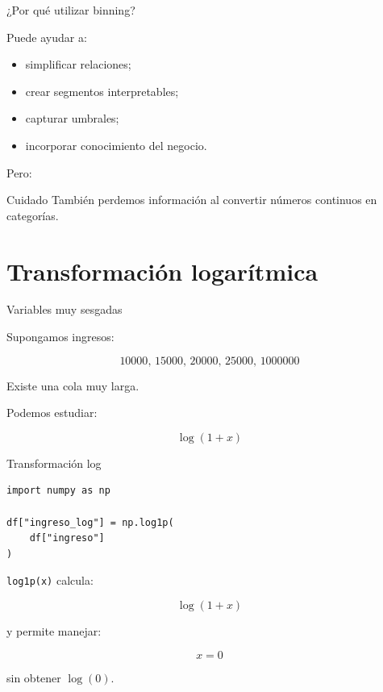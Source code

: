 \documentclass[aspectratio=169,11pt]{beamer}
\begin{document}

\begin{frame}{¿Por qué utilizar binning?}

Puede ayudar a:

\begin{itemize}

    \item simplificar relaciones;

    \item crear segmentos interpretables;

    \item capturar umbrales;

    \item incorporar conocimiento del negocio.

\end{itemize}

Pero:

\begin{alertblock}{Cuidado}
También perdemos información al convertir números continuos
en categorías.
\end{alertblock}

\end{frame}

\section{Transformación logarítmica}

\begin{frame}{Variables muy sesgadas}

Supongamos ingresos:

\[
10000,\,
15000,\,
20000,\,
25000,\,
1000000
\]

Existe una cola muy larga.

Podemos estudiar:

\[
\log(1+x)
\]

\end{frame}


\begin{frame}[fragile]{Transformación log}

\begin{lstlisting}
import numpy as np

df["ingreso_log"] = np.log1p(
    df["ingreso"]
)
\end{lstlisting}

\texttt{log1p(x)} calcula:

\[
\log(1+x)
\]

y permite manejar:

\[
x=0
\]

sin obtener $\log(0)$.

\end{frame}
\end{document}
